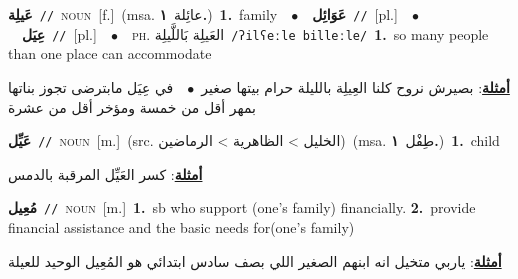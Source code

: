 \documentclass[10pt,a4paper,twoside]{article} %
\begin{document}
\begin{multicols}{2}
{\setlength\topsep{0pt}\textbf{\foreignlanguage{arabic}{عَيلِة}}\ {\color{gray}\texttt{//}\color{black}}\ \textsc{noun}\ [f.]\ \color{gray}(msa. \foreignlanguage{arabic}{عائِلة}~\foreignlanguage{arabic}{\textbf{١.}})\color{black}\ \textbf{1.}~family\ \ $\bullet$\ \ \setlength\topsep{0pt}\textbf{\foreignlanguage{arabic}{عَوَائِل}}\ {\color{gray}\texttt{//}\color{black}}\ [pl.]\ \ $\bullet$\ \ \setlength\topsep{0pt}\textbf{\foreignlanguage{arabic}{عِيَل}}\ {\color{gray}\texttt{//}\color{black}}\ [pl.]\ \ $\bullet$\ \ \textsc{ph.} \color{gray} \foreignlanguage{arabic}{العَيلِة بَاللَّيلِة}\color{black}\ {\color{gray}\texttt{/{\sffamily ʔilʕeːle billeːle}/}\color{black}}\ \textbf{1.}~so many people than one place can accommodate\  \begin{flushright}\color{gray}\foreignlanguage{arabic}{\textbf{\underline{\foreignlanguage{arabic}{أمثلة}}}: بصيرش نروح كلنا العِيلِة بالليلة حرام بيتها صغير\ $\bullet$\ \  في عِيَل مابترضى تجوز بناتها بمهر أقل من خمسة ومؤخر أقل من عشرة}\end{flushright}\color{black}} \vspace{2mm}

{\setlength\topsep{0pt}\textbf{\foreignlanguage{arabic}{عَيِّل}}\ {\color{gray}\texttt{//}\color{black}}\ \textsc{noun}\ [m.]\ (src. \color{gray}\foreignlanguage{arabic}{الخليل > الظاهرية > الرماضين}\color{black})\ \color{gray}(msa. \foreignlanguage{arabic}{طِفْل}~\foreignlanguage{arabic}{\textbf{١.}})\color{black}\ \textbf{1.}~child\  \begin{flushright}\color{gray}\foreignlanguage{arabic}{\textbf{\underline{\foreignlanguage{arabic}{أمثلة}}}: كسر العَيِّل المرقبة بالدمس}\end{flushright}\color{black}} \vspace{2mm}

{\setlength\topsep{0pt}\textbf{\foreignlanguage{arabic}{مُعِيل}}\ {\color{gray}\texttt{//}\color{black}}\ \textsc{noun}\ [m.]\ \textbf{1.}~sb who support (one's family) financially.  \textbf{2.}~provide financial assistance and the basic needs for(one's family)\  \begin{flushright}\color{gray}\foreignlanguage{arabic}{\textbf{\underline{\foreignlanguage{arabic}{أمثلة}}}: ياربي متخيل انه ابنهم الصغير اللي بصف سادس ابتدائي هو المُعِيل الوحيد للعيلة}\end{flushright}\color{black}} \vspace{2mm}


\end{multicols}
\end{document}

